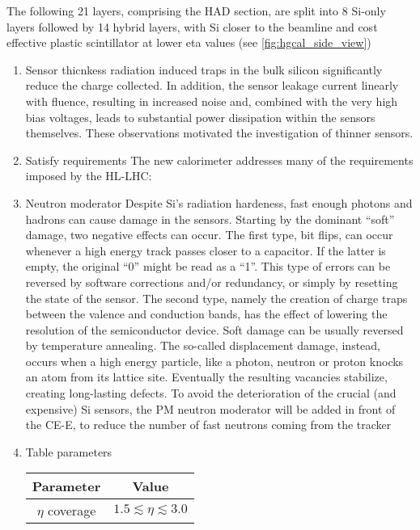 \documentclass[11pt]{article}
\begin{document}
The following 21 layers, comprising the \ac{HAD} section, are split into 8 \ac{Si}-only layers followed by 14 hybrid layers, with \ac{Si} closer to the beamline and cost effective plastic scintillator at lower \ac{eta} values (see \cref{fig:hgcal_side_view})
\begin{enumerate}
\item Sensor thicnkess
\label{sec:orgca4b33a}
radiation induced traps in the bulk silicon significantly reduce the charge collected.
In addition, the sensor leakage current linearly with fluence, resulting in increased noise and, combined with the very high
bias voltages, leads to substantial power dissipation within the sensors themselves.
These observations motivated the investigation of thinner sensors. \cite{hgcalTDR}
\item Satisfy requirements
\label{sec:org49e7590}
The new calorimeter addresses many of the requirements imposed by the \ac{HL-LHC}:
\item Neutron moderator
\label{sec:org2c53e9d}
Despite \ac{Si}'s radiation hardeness, fast enough photons and hadrons can cause damage in the sensors.
Starting by the dominant ``soft'' damage, two negative effects can occur.
The first type, bit flips, can occur whenever a high energy track passes closer to a capacitor.
If the latter is empty, the original ``0'' might be read as a ``1''.
This type of errors can be reversed by software corrections and/or redundancy, or simply by resetting the state of the sensor.
The second type, namely the creation of charge traps between the valence and conduction bands, has the effect of lowering the resolution of the semiconductor device.
Soft damage can be usually reversed by temperature annealing.
The so-called displacement damage, instead, occurs when a high energy particle, like a photon, neutron or proton knocks an atom from its lattice site. Eventually the resulting vacancies stabilize, creating long-lasting defects.
To avoid the deterioration of the crucial (and expensive) \ac{Si} sensors, the \ac{PM} neutron moderator will be added in front of the \ac{CE-E}, to reduce the number of fast neutrons coming from the tracker \cite{calorimetry_fabjan,radiation_damage_silicon2,radiation_damage_silicon}
\item Table parameters
\label{sec:orgdb86575}
\begin{table}[!h]
\centering
\begin{tabular}{c|c}
Parameter & Value\\
\hline
\(\eta\) coverage & \(1.5 \lesssim \eta \lesssim 3.0\)\\

\end{tabular}
\end{table}
\end{enumerate}
\end{document}
